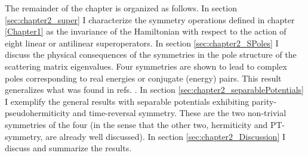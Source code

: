 The remainder of the chapter is organized as follows. In section \ref{sec:chapter2_super} I characterize the symmetry operations defined in chapter \ref{Chapter1} as the invariance of the Hamiltonian with respect to the action of eight linear or antilinear superoperators. In section \ref{sec:chapter2_SPoles} I discuss the physical consequences of the symmetries in the pole structure of the scattering matrix eigenvalues. Four symmetries are shown to lead to complex poles corresponding to real energies or conjugate (energy) pairs. This result generalizes what was found in refs. \cite{Mostafazadeh2002,Mostafazadeh2002a,Mostafazadeh2002b}. In section \ref{sec:chapter2_separablePotentials} I exemplify the general results with separable potentials exhibiting parity-pseudohermiticity and time-reversal symmetry. These are the two non-trivial symmetries of the four (in the sense that the other two, hermiticity and PT-symmetry, are already well discussed). In section \ref{sec:chapter2_Discussion} I discuss and summarize the results.
%
